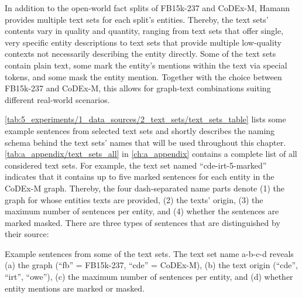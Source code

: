 In addition to the open-world fact splits of FB15k-237 and CoDEx-M, Hamann provides multiple text sets for each split's entities. Thereby, the text sets' contents vary in quality and quantity, ranging from text sets that offer single, very specific entity descriptions to text sets that provide multiple low-quality contexts not necessarily describing the entity directly. Some of the text sets contain plain text, some mark the entity's mentions within the text via special tokens, and some mask the entity mention. Together with the choice between FB15k-237 and CoDEx-M, this allows for graph-text combinations suiting different real-world scenarios.

\autoref{tab:5_experiments/1_data_sources/2_text_sets/text_sets_table} lists some example sentences from selected text sets and shortly describes the naming schema behind the text sets' names that will be used throughout this chapter. \autoref{tab:a_appendix/text_sets_all} in \autoref{ch:a_appendix} contains a complete list of all considered text sets. For example, the text set named ``cde-irt-5-marked'' indicates that it contains up to five marked sentences for each entity in the CoDEx-M graph. Thereby, the four dash-separated name parts denote (1) the graph for whose entities texts are provided, (2) the texts' origin, (3) the maximum number of sentences per entity, and (4) whether the sentences are marked masked. There are three types of sentences that are distinguished by their source:

\begin{table}
    \centering
    
    \caption{Example sentences from some of the text sets. The text set name a-b-c-d reveals (a) the graph (``fb'' = FB15k-237, ``cde'' = CoDEx-M), (b) the text origin (``cde'', ``irt'', ``owe''), (c) the maximum number of sentences per entity, and (d) whether entity mentions are marked or masked.}
    \label{tab:5_experiments/1_data_sources/2_text_sets/text_sets_table}
\end{table}


